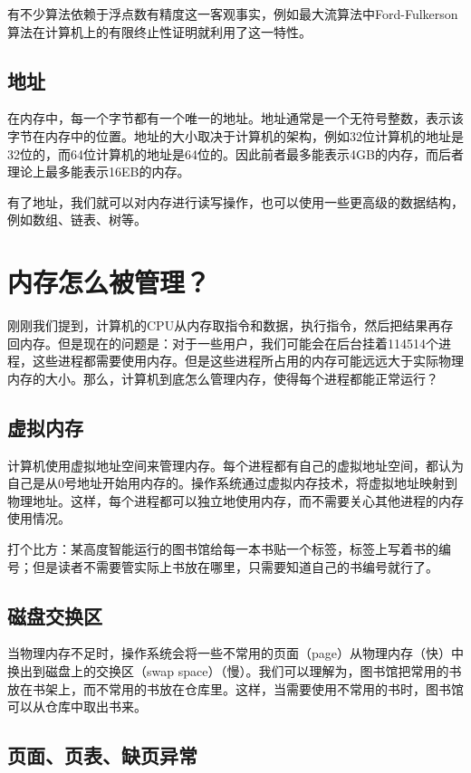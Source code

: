 \documentclass[../main.tex]{subfiles}
\begin{document}
有不少算法依赖于浮点数有精度这一客观事实，例如最大流算法中Ford-Fulkerson算法在计算机上的有限终止性证明就利用了这一特性。

\subsection{地址}

在内存中，每一个字节都有一个唯一的地址。地址通常是一个无符号整数，表示该字节在内存中的位置。地址的大小取决于计算机的架构，例如32位计算机的地址是32位的，而64位计算机的地址是64位的。因此前者最多能表示4GB的内存，而后者理论上最多能表示16EB的内存。

有了地址，我们就可以对内存进行读写操作，也可以使用一些更高级的数据结构，例如数组、链表、树等。

\section{内存怎么被管理？}

刚刚我们提到，计算机的CPU从内存取指令和数据，执行指令，然后把结果再存回内存。但是现在的问题是：对于一些用户，我们可能会在后台挂着114514个进程，这些进程都需要使用内存。但是这些进程所占用的内存可能远远大于实际物理内存的大小。那么，计算机到底怎么管理内存，使得每个进程都能正常运行？

\subsection{虚拟内存}

计算机使用虚拟地址空间来管理内存。每个进程都有自己的虚拟地址空间，都认为自己是从0号地址开始用内存的。操作系统通过虚拟内存技术，将虚拟地址映射到物理地址。这样，每个进程都可以独立地使用内存，而不需要关心其他进程的内存使用情况。

打个比方：某高度智能运行的图书馆给每一本书贴一个标签，标签上写着书的编号；但是读者不需要管实际上书放在哪里，只需要知道自己的书编号就行了。

\subsection{磁盘交换区}

当物理内存不足时，操作系统会将一些不常用的页面（page）从物理内存（快）中换出到磁盘上的交换区（swap space）（慢）。我们可以理解为，图书馆把常用的书放在书架上，而不常用的书放在仓库里。这样，当需要使用不常用的书时，图书馆可以从仓库中取出书来。

\subsection{页面、页表、缺页异常}
\end{document}
